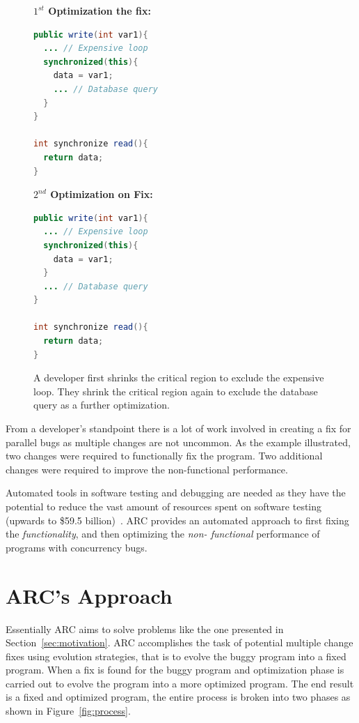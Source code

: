 \documentclass[10pt, conference, compsocconf]{IEEEtran}
\begin{document}
\begin{figure}[!h]
\vspace{2mm}
\begin{minipage}{3.70cm}
\footnotesize{\textbf{$1^{st}$ Optimization the fix:}}
\begin{lstlisting}[language=Java]
public write(int var1){
  ... // Expensive loop
  synchronized(this){
    data = var1;
    ... // Database query
  }
}

int synchronize read(){
  return data;
}
\end{lstlisting}
\end{minipage}\hfill
\begin{minipage}{3.70cm}
\footnotesize{\textbf{$2^{nd}$ Optimization on Fix:}}
\begin{lstlisting}[language=Java]
public write(int var1){
  ... // Expensive loop
  synchronized(this){
    data = var1;
  }
  ... // Database query
}

int synchronize read(){
  return data;
}
\end{lstlisting}
\end{minipage}
\caption{A developer first shrinks the critical region to exclude the expensive
loop. They shrink the critical region again to exclude the database query as a
further optimization.}
\label{fig:optimized_sample_datarace}
\end{figure}

From a developer's standpoint there is a lot of work involved in creating a fix
for parallel bugs as multiple changes are not uncommon. As the example
illustrated, two changes were required to functionally fix the program. Two
additional changes were required to improve the non-functional performance.

Automated tools in software testing and debugging are needed as they have the
potential to reduce the vast amount of resources spent on software testing
(upwards to \$59.5 billion)~\cite{RTI02}. ARC provides an automated approach to
first fixing the \textit{functionality}, and then optimizing the \textit{non-
functional} performance of programs with concurrency bugs.

\section{ARC's Approach}
\label{sec:approach}

Essentially ARC aims to solve problems like the one presented in
Section~\ref{sec:motivation}. ARC accomplishes the task of potential multiple
change fixes using evolution strategies, that is to evolve the buggy program
into a fixed program. When a fix is found for the buggy program and
optimization phase is carried out to evolve the program into a more optimized
program. The end result is a fixed and optimized program, the entire process is
broken into two phases as shown in Figure~\ref{fig:process}.
\end{document}
